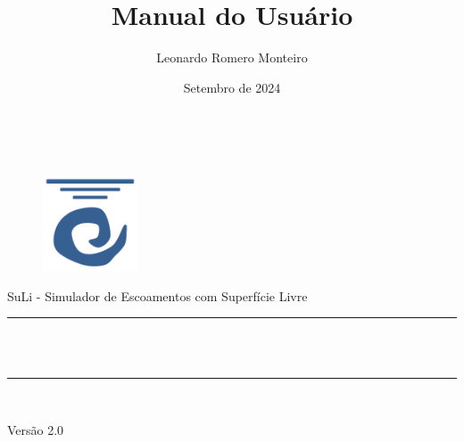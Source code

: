 \documentclass[12pt, a4paper]{article}
\title{Manual do Usuário}
\author{
  Leonardo Romero Monteiro \\[.5 cm]
}
\date{Setembro de 2024}
\makeatletter
\let\thetitle\@title
\let\theauthor\@author
\let\thedate\@date
\makeatother
\begin{document}
\begin{titlepage}
$ $

\vspace{3cm}
\begin{center}

\begin{figure}[htp]
\centering
\includegraphics[width=0.25\textwidth]{suli}
\end{figure}

\vspace{1cm}

{\LARGE SuLi - Simulador de Escoamentos com Superfície Livre}

	\noindent\rule{\linewidth}{0.2 mm} \\[1 cm]
	{\LARGE \bfseries \thetitle}\\[.7 cm]
	\rule{\linewidth}{0.2 mm} \\[1 cm]

	{ \Large \theauthor}
	\end{center}

\vspace{6cm}

	\begin{flushleft}
	  Versão 2.0 \\  \thedate
	\end{flushleft}
	
\end{titlepage}

\newpage
\end{document}
